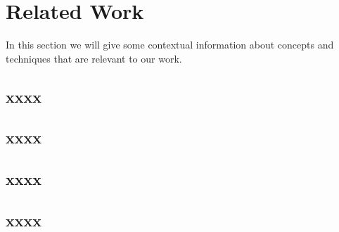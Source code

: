 
\section{Related Work}
\label{sec:RelatedWork}

In this section we will give some contextual information about concepts and techniques that are relevant to our work.


\subsection{xxxx}
\label{subsec:xxxxx}



\subsection{xxxx}
\label{subsec:xxxxxx}



\subsection{xxxx}
\label{subsec:xxxxxx}



\subsection{xxxx}
\label{subsec:xxxxxx}



